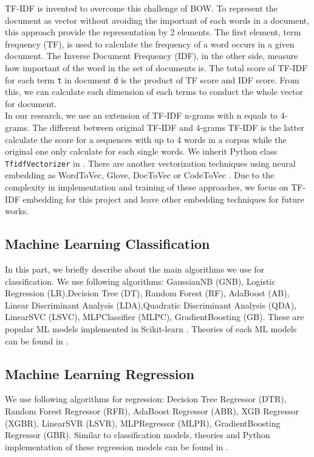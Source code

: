 TF-IDF \cite{008} is invented to overcome this challenge of BOW. To represent the document as vector without avoiding the important of each words in a document, this approach provide the representation by 2 elements. The first element, term frequency (TF), is used to calculate the frequency of a word occurs in a given document. The Inverse Document Frequency (IDF), in the other side, measure how important of the word in the set of documents is. The total score of TF-IDF for each term \texttt{t} in document \texttt{d} is the product of TF score and IDF score. From this, we can calculate each dimension of each terms to conduct the whole vector for document.
\\
In our research, we use an extension of TF-IDF n-grams with n equals to 4-grams. The different between original TF-IDF and 4-grams TF-IDF is the latter calculate the score for a sequences with up to 4 words in a corpus while the original one only calculate for each single words. We inherit Python class \texttt{TfidfVectorizer} in \cite{009}. There are another vectorization techniques using neural embedding as WordToVec, Glove, DocToVec or CodeToVec \cite{013}. Due to the complexity in implementation and training of these approaches, we focus on TF-IDF embedding for this project and leave other embedding techniques for future works.


\subsection{Machine Learning Classification}
In this part, we briefly describe about the main algorithms we use for classification. We use following algorithms: GaussianNB (GNB), Logistic Regression (LR),Decision Tree (DT),
Random Forest (RF), AdaBoost (AB), Linear Discriminant Analysis (LDA),Quadratic Discriminant Analysis (QDA),
LinearSVC (LSVC), MLPClassifier (MLPC), GradientBoosting (GB). These are popular ML models implemented in Scikit-learn \cite{010}. Theories of each ML models can be found in \cite{011,012}. 


\subsection{Machine Learning Regression}
We use following algorithms for regression: Decision Tree Regressor (DTR), Random Forest Regressor (RFR), AdaBoost Regressor (ABR),
XGB Regressor (XGBR),
LinearSVR (LSVR), MLPRegressor (MLPR), GradientBoosting Regressor (GBR). Similar to classification models, theories and Python implementation of these regression models can be found in \cite{010,011,012}.


